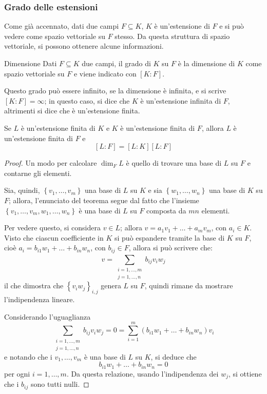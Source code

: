 \documentclass[11pt, a4paper]{scrartcl}
\theoremstyle{definition}
\numberwithin{esempio}{section}
\theoremstyle{definition}
\numberwithin{obs}{section}
\numberwithin{nota}{section}
\numberwithin{equation}{subsection}
\begin{document}
\subsubsection{Grado delle estensioni}
Come gi\`a accennato, dati due campi $F \subseteq K$, $K$ \`e un'estensione di $F$ e si pu\`o vedere come spazio vettoriale su $F$ stesso.
Da questa struttura di spazio vettoriale, si possono ottenere alcune informazioni.
\begin{definizione}
	{Dimensione}{}
	Dati $F \subseteq K$ due campi, il grado di $K$ su $F$ \`e la dimensione di $K$ come spazio vettoriale su $F$ e viene indicato con $[K:F]$.

	Questo grado pu\`o essere infinito, se la dimensione \`e infinita, e si scrive $[K:F] = \infty$; in questo caso, si dice che $K$ \`e un'estensione infinita di $F$, altrimenti si dice che \`e un'estensione finita.
\end{definizione}
\begin{teorema}
	{}{}
	Se $L$ \`e un'estensione finita di $K$ e $K$ \`e un'estensione finita di $F$, allora $L$ \`e un'estensione finita di $F$ e 
	\[
		[L:F] = [L:K][L:F]
	\] 
	\begin{proof}
	Un modo per calcolare $\dim _F L$ \`e quello di trovare una base di $L$ su $F$ e contarne gli elementi.

	Sia, quindi, $\left\{ v_1,\ldots,v_m \right\} $ una base di $L$ su $K$ e sia $\left\{ w_1,\ldots,w_n \right\} $ una base di $K$ su $F$; allora, l'enunciato del teorema segue dal fatto che l'insieme $\left\{ v_1,\ldots,v_m ,w_1 ,\ldots,w_n \right\} $ \`e una base di $L$ su $F$ composta da $mn$ elementi.

	Per vedere questo, si considera $v \in L$; allora $v=a_1v_1+ \ldots + a_m v_m$, con $a_i \in K$.
	Visto che ciascun coefficiente in $K$ si pu\`o espandere tramite la base di $K$ su $F$, cio\`e $a_i = b_{i1}w_1 + \ldots + b_{in} w_n $, con $b_{ij}  \in F$, allora si pu\`o scrivere che:
	\[
		v = \sum_{\substack{i=1,\ldots,m\\ j=1,\ldots,n}}^{} b_{ij} v_i w_j
	\] 
	il che dimostra che $\left\{ v_iw_j \right\}_{i,j}  $ genera $L$ su $F$, quindi rimane da mostrare l'indipendenza lineare.

	Considerando l'uguaglianza
	\[
		\sum_{\substack{i=1,\ldots,m \\ j =1,\ldots,n}}^{} b_{ij} v_i w_j = 0 = \sum_{i=1}^{m} \left(b_{i 1} w_1 + \ldots + b_{in} w_n\right) v_i
	\] 
	e notando che i $v_1, \ldots, v_m$ \`e una base di $L$ su $K$, si deduce che 
	\[
	b_{i 1} w_1 + \ldots+b_{in} w_n = 0
	\] 
	per ogni $i =1 ,\ldots, m$.
Da questa relazione, usando l'indipendenza dei $w_j$, si ottiene che i $b_{ij} $ sono tutti nulli.
	\end{proof}
\end{teorema}
\end{document}
